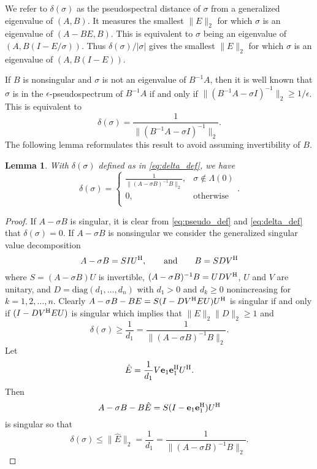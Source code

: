 \documentclass[12pt]{article}
\def\eqand{\qquad\mbox{and}\qquad}
\def\vec#1{{\bf #1}}
\def\H{{\rm H}}
\def\diag{\mbox{diag}}
\newtheorem{lemma}{Lemma}
\begin{document}
We refer to $\delta(\sigma)$ as the pseudospectral distance of
$\sigma$ from a generalized eigenvalue of $(A,B)$.  It measures the
smallest $\|E\|_2$ for which $\sigma$ is an eigenvalue of $(A-BE, B)$.
This is equivalent to $\sigma$ being an eigenvalue of
$(A, B(I-E/\sigma))$.  Thus $\delta(\sigma)/|\sigma|$ gives the
smallest $\|E\|_2$ for which $\sigma$ is an eigenvalue of
$(A, B(I-E))$.

If $B$ is nonsingular and $\sigma$ is not an eigenvalue of $B^{-1}A$,
then it is well known that $\sigma$ is in the
$\epsilon$-pseudospectrum of $B^{-1}A$ if and only if
$\|(B^{-1}A - \sigma I)^{-1}\|_2\geq 1/\epsilon$.  This is equivalent
to
\begin{equation*}
  \delta(\sigma) = \frac{1}{\|(B^{-1}A - \sigma I)^{-1}\|_2}.
\end{equation*}
The following lemma reformulates this result to avoid assuming
invertibility of $B$.
\begin{lemma}
  \label{lm:X_norm_bound}
  With $\delta(\sigma)$ defined as in \eqref{eq:delta_def}, we have
  \begin{equation*}
     \delta(\sigma) 
     = 
     \left\{
       \begin{array}{ll}
         \frac{1}{\|(A-\sigma B)^{-1} B\|_2}, & \sigma \notin \Lambda(0) \\
         0, & \mbox{otherwise} \\
       \end{array}
     \right..
  \end{equation*}
\end{lemma}
\begin{proof}
  If $A-\sigma B$ is singular, it is clear from \eqref{eq:pseudo_def}
  and \eqref{eq:delta_def} that $\delta(\sigma)=0$.  If $A-\sigma B$
  is nonsingular we consider the generalized singular value
  decomposition
  \begin{equation*}
    A - \sigma B = S I U^\H,\eqand
    B = S D V^\H
  \end{equation*}
  where $S=(A-\sigma B)U$ is invertible,
  $(A-\sigma B)^{-1} B = U D V^\H$, $U$ and $V$ are unitary, and
  $D = \diag(d_1, \ldots, d_n)$ with $d_1 > 0$ and $d_k\geq 0$
  nonincreasing for $k=1,2,\ldots, n$.   Clearly
  $A-\sigma B - BE = S (I - D V^\H E U) U^\H$ is
  singular if and only if $(I - D V^\H E U)$ is singular which implies
  that $\|E\|_2 \|D\|_2 \geq 1$ and
  \begin{equation*}
    \delta(\sigma)
    \geq \frac{1}{d_1} =
    \frac{1}{\|(A-\sigma B)^{-1}B\|_2}.
  \end{equation*}
  Let  
  \begin{equation*}
    \hat{E} = \frac{1}{d_1}V \vec{e}_1 \vec{e}_1^\H U^\H.
  \end{equation*}
  Then
  \begin{equation*}
    A-\sigma B - B \hat{E} = S (I-\vec{e}_1 \vec{e}_1^\H) U^\H
  \end{equation*}
  is singular so that
  \begin{equation*}
    \delta(\sigma)
    \leq \|\hat{E}\|_2 
    = \frac{1}{d_1} = \frac{1}{\|(A-\sigma B)^{-1} B\|_2}.
  \end{equation*}
\end{proof}
\end{document}
